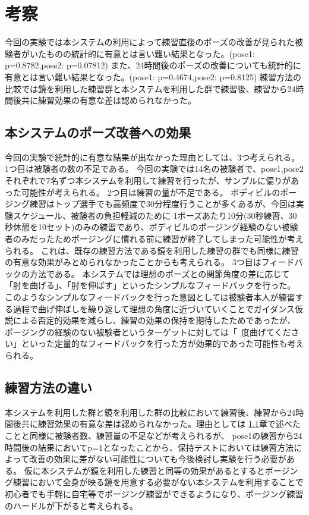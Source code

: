 \chapter{考察}
\label{consideration}
今回の実験では本システムの利用によって練習直後のポーズの改善が見られた被験者がいたものの統計的に有意とは言い難い結果となった。(pose1: p=0.8782,pose2: p=0.07812)
また、24時間後のポーズの改善についても統計的に有意とは言い難い結果となった。(pose1: p=0.4674,pose2: p=0.8125)
練習方法の比較では鏡を利用した練習群と本システムを利用した群で練習後、練習から24時間後共に練習効果の有意な差は認められなかった。

\section{本システムのポーズ改善への効果}
\label{sec:pose_improvement_from_system}
今回の実験で統計的に有意な結果が出なかった理由としては、3つ考えられる。
1つ目は被験者の数の不足である。
今回の実験では14名の被験者で、pose1,pose2それぞれで7名ずつ本システムを利用して練習を行ったが、サンプルに偏りがあった可能性が考えられる。
2つ目は練習の量が不足である。
ボディビルのポージング練習はトップ選手でも高頻度で30分程度行うことが多くあるが、今回は実験スケジュール、被験者の負担軽減のために
1ポーズあたり10分(30秒練習、30秒休憩を10セット)のみの練習であり、ボディビルのポージング経験のない被験者のみだったためポージングに慣れる前に練習が終了してしまった可能性が考えられる。
これは、既存の練習方法である鏡を利用した練習の群でも同様に練習の有意な効果がみとめられなかったことからも考えられる。
3つ目はフィードバックの方法である。
本システムでは理想のポーズとの関節角度の差に応じて「肘を曲げる」、「肘を伸ばす」といったシンプルなフィードバックを行った。
このようなシンプルなフィードバックを行った意図としては被験者本人が練習する過程で曲げ伸ばしを繰り返して理想の角度に近づいていくことでガイダンス仮説による否定的効果を減らし、練習の効果の保持を期待したためであったが、
ポージングの経験のない被験者というターゲットに対しては「~度曲げてください」といった定量的なフィードバックを行った方が効果的であった可能性も考えられる。

\section{練習方法の違い}
本システムを利用した群と鏡を利用した群の比較において練習後、練習から24時間後共に練習効果の有意な差は認められなかった。理由としては
\ref{sec:pose_improvement_from_system}章で述べたことと同様に被験者数、練習量の不足などが考えられるが、
pose1の練習から24時間後の結果においてp=1となったことから、保持テストにおいては練習方法によって改善の効果に差がない可能性についても今後検討し実験を行う必要がある。
仮に本システムが鏡を利用した練習と同等の効果があるとするとポージング練習において全身が映る鏡を用意する必要がない本システムを利用することで
初心者でも手軽に自宅等でポージング練習ができるようになり、ポージング練習のハードルが下がると考えられる。